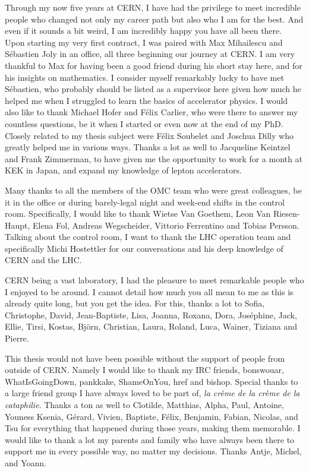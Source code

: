 Through my now five years at CERN, I have had the privilege to meet incredible people who changed
not only my career path but also who I am for the best. And even if it sounds a bit weird, I am
incredibly happy you have all been there.\\
\indent
Upon starting my very first contract, I was paired with Max Mihailescu and Sébastien Joly in an
office, all three beginning our journey at CERN. I am very thankful to Max for having been a good
friend during his short stay here, and for his insights on mathematics. I consider myself
remarkably lucky to have met Sébastien, who probably should be listed as a supervisor here given how 
much he helped me when I struggled to learn the basics of accelerator physics.
I would also like to thank Michael Hofer and Félix Carlier, who were there to answer my countless
questions, be it when I started or even now at the end of my PhD.
Closely related to my thesis subject were Félix Soubelet and Joschua Dilly who greatly helped me in
various ways.
Thanks a lot as well to Jacqueline Keintzel and Frank Zimmerman, to have given me the opportunity to
work for a month at KEK in Japan, and expand my knowledge of lepton accelerators. 

Many thanks to all the members of the OMC team who were great colleagues, be it in the office or
during barely-legal night and week-end shifts in the control room. Specifically, I would like to
thank Wietse Van Goethem, Leon Van Riesen-Haupt, Elena Fol, Andreas Wegscheider, Vittorio Ferrentino
and Tobias Persson. Talking about the control room, I want to thank the LHC operation team and
specifically Michi Hostettler for our conversations and his deep knowledge of CERN and the LHC.

CERN being a vast laboratory, I had the pleasure to meet remarkable people who I enjoyed to be
around. I cannot detail how much you all mean to me as this is already quite long, but you get the 
idea. For this, thanks a lot to Sofia, Christophe, David, Jean-Baptiste, Lisa, Joanna, Roxana, Dora,
Joséphine, Jack, Ellie, Tirsi, Kostas, Björn, Christian, Laura, Roland, Luca, Wainer, Tiziana and
Pierre.

This thesis would not have been possible without the support of people from outside of CERN. Namely
I would like to thank my IRC friends, bonswouar, WhatIsGoingDown, pankkake, ShameOnYou, href and
bishop. Special thanks to a large friend group I have always loved to be part of, \textit{la crème
de la crème de la cataphilie}.
Thanks a ton as well to Clotilde, Matthias, Alpha, Paul, Antoine, Youness  Ksenia, Gérard, Vivien,
Baptiste, Félix, Benjamin, Fabian, Nicolas, and Tsu for everything that happened during those years,
making them memorable.
I would like to thank a lot my parents and family who have always been there to support me in every
possible way, no matter my decisions. Thanks Antje, Michel, and Yoann.
